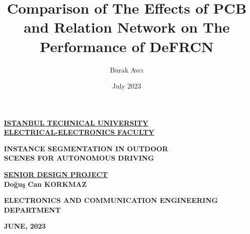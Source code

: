 \documentclass[12pt,a4paper]{report}
\title{\textbf{Comparison of The Effects of PCB and Relation Network on The Performance of DeFRCN}}
\author{Burak Avcı}
\date{July 2023}
\begin{document}

\begin{titlepage}
   \begin{center}  
   \underline{\textbf{ISTANBUL TECHNICAL UNIVERSITY}}\\     
   \underline{\textbf{ELECTRICAL-ELECTRONICS FACULTY}}\\
       
    \vspace*{3cm}
    

    \textbf{INSTANCE SEGMENTATION IN OUTDOOR}\\
    \textbf{SCENES FOR AUTONOMOUS DRIVING}\\
    
    
    \vspace{3cm}
    
    
    \underline{\textbf{SENIOR DESIGN PROJECT}}\\
    \vspace{1cm}
    \textbf{Doğuş Can KORKMAZ} \\
    
       \vfill
       
       
       
        \vspace{1.5cm}
        
    \textbf{ELECTRONICS AND COMMUNICATION ENGINEERING}\\ \textbf{DEPARTMENT}\\
    
            
       \vspace{2cm}
     

            

       \textbf{JUNE, 2023}
            
   \end{center}
\end{titlepage}
\end{document}
